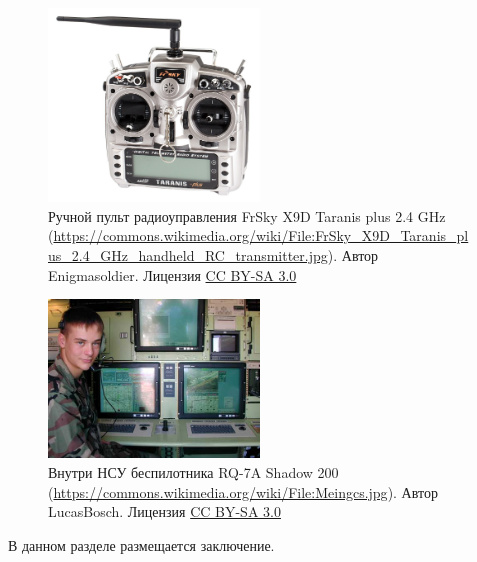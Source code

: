 \documentclass[specification,annotation]{itmo-student-thesis}
\begin{document}
\begin{figure}[!h]
  \caption{Ручной пульт радиоуправления FrSky X9D Taranis plus 2.4 GHz
  (\url{https://commons.wikimedia.org/wiki/File:FrSky_X9D_Taranis_plus_2.4_GHz_handheld_RC_transmitter.jpg}).
  Автор Enigmasoldier. Лицензия
  \href{https://creativecommons.org/licenses/by-sa/3.0/deed.en}{CC BY-SA 3.0}
  }\label{pic:rc-tx}
  \centering
  \includegraphics[width=0.5\textwidth]{rc-tx}
\end{figure}

\begin{figure}[!h]
  \caption{Внутри НСУ беспилотника RQ-7A Shadow 200
  (\url{https://commons.wikimedia.org/wiki/File:Meingcs.jpg}).
  Автор LucasBosch. Лицензия
  \href{https://creativecommons.org/licenses/by-sa/3.0/deed.en}{CC BY-SA 3.0}
  }\label{pic:gcs}
  \centering
  \includegraphics[width=0.5\textwidth]{gcs}
\end{figure}

\chapterconclusion

\startconclusionpage

В данном разделе размещается заключение.

\printmainbibliography
\nocite{*}

\appendix
\end{document}
